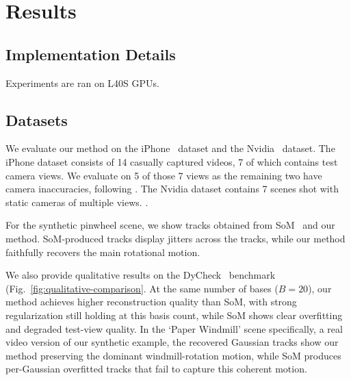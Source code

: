 \section{Results}


\label{sec:Discussion}

\subsection{Implementation Details}

Experiments are ran on L40S GPUs. 

\subsection{Datasets}
We evaluate our method on the iPhone~\cite{gao2022dynamic} dataset and the Nvidia~\cite{yoon2020novel} dataset. The iPhone dataset consists of 14 casually captured videos, 7 of which contains test camera views. We evaluate on 5 of those 7 views as the remaining two have camera inaccuracies, following \cite{wang2025shape}. The Nvidia dataset contains 7 scenes shot with static cameras of multiple views. . 

For the synthetic pinwheel scene, we show tracks obtained from SoM~\cite{wang2025shape} and our method.
SoM-produced tracks display jitters across the tracks, while our method faithfully recovers the main rotational motion.

% 
% 

We also provide qualitative results on the DyCheck~\cite{gao2022dynamic} benchmark (Fig.~\ref{fig:qualitative-comparison}. 
At the same number of bases ($B=20$), our method achieves higher reconstruction quality than SoM, with strong regularization still holding at this basis count, while SoM shows clear overfitting and degraded test-view quality. In the `Paper Windmill' scene specifically, a real video version of our synthetic example, the recovered Gaussian tracks show our method preserving the dominant windmill-rotation motion, while SoM produces per-Gaussian overfitted tracks that fail to capture this coherent motion.


